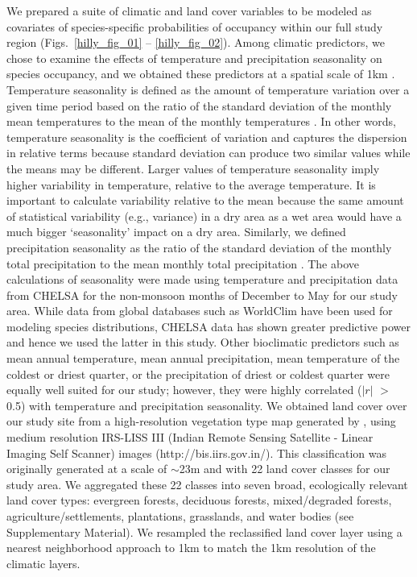 We prepared a suite of climatic and land cover variables to be modeled as covariates of species-specific probabilities of occupancy within our full study region (Figs.~\ref{hilly_fig_01} -- \ref{hilly_fig_02}).
Among climatic predictors, we chose to examine the effects of temperature and precipitation seasonality on species occupancy, and we obtained these predictors at a spatial scale of 1km \citep[Climatologies at High resolution for the Earth's Land Surface Areas; CHELSA:][]{karger2017}.
Temperature seasonality is defined as the amount of temperature variation over a given time period based on the ratio of the standard deviation of the monthly mean temperatures to the mean of the monthly temperatures \citep{odonnell2012}.
In other words, temperature seasonality is the coefficient of variation and captures the dispersion in relative terms because standard deviation can produce two similar values while the means may be different.
Larger values of temperature seasonality imply higher variability in temperature, relative to the average temperature.
It is important to calculate variability relative to the mean because the same amount of statistical variability (e.g., variance) in a dry area as a wet area would have a much bigger `seasonality' impact on a dry area.
Similarly, we defined precipitation seasonality as the ratio of the standard deviation of the monthly total precipitation to the mean monthly total precipitation \citep{odonnell2012}.
The above calculations of seasonality were made using temperature and precipitation data from CHELSA for the non-monsoon months of December to May for our study area.
While data from global databases such as WorldClim have been used for modeling species distributions, CHELSA data has shown greater predictive power \citep{karger2017} and hence we used the latter in this study.
Other bioclimatic predictors such as mean annual temperature, mean annual precipitation, mean temperature of the coldest or driest quarter, or the precipitation of driest or coldest quarter were equally well suited for our study; however, they were highly correlated ($|r|$ $>$ 0.5) with temperature and precipitation seasonality.
We obtained land cover over our study site from a high-resolution vegetation type map generated by \citep{roy2015}, using medium resolution IRS-LISS III (Indian Remote Sensing Satellite - Linear Imaging Self Scanner) images (http://bis.iirs.gov.in/).
This classification was originally generated at a scale of $\sim$23m and with 22 land cover classes for our study area.
We aggregated these 22 classes into seven broad, ecologically relevant land cover types: evergreen forests, deciduous forests, mixed/degraded forests, agriculture/settlements, plantations, grasslands, and water bodies (see Supplementary Material).
We resampled the reclassified land cover layer using a nearest neighborhood approach to 1km to match the 1km resolution of the climatic layers.

